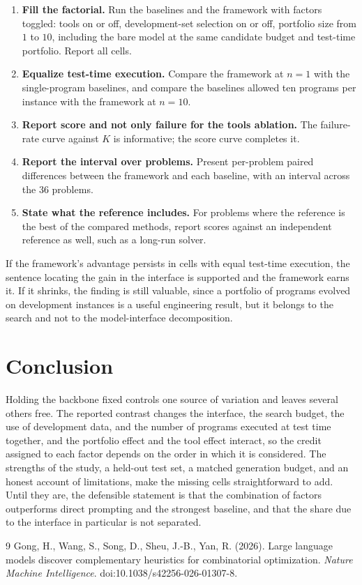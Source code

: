 \documentclass[11pt]{article}
\theoremstyle{definition}
\begin{document}
\begin{enumerate}
\item \textbf{Fill the factorial.} Run the baselines and the framework with factors toggled: tools on or off, development-set selection on or off, portfolio size from $1$ to $10$, including the bare model at the same candidate budget and test-time portfolio. Report all cells.
\item \textbf{Equalize test-time execution.} Compare the framework at $n=1$ with the single-program baselines, and compare the baselines allowed ten programs per instance with the framework at $n=10$.
\item \textbf{Report score and not only failure for the tools ablation.} The failure-rate curve against $K$ is informative; the score curve completes it.
\item \textbf{Report the interval over problems.} Present per-problem paired differences between the framework and each baseline, with an interval across the 36 problems.
\item \textbf{State what the reference includes.} For problems where the reference is the best of the compared methods, report scores against an independent reference as well, such as a long-run solver.
\end{enumerate}
If the framework's advantage persists in cells with equal test-time execution, the sentence locating the gain in the interface is supported and the framework earns it. If it shrinks, the finding is still valuable, since a portfolio of programs evolved on development instances is a useful engineering result, but it belongs to the search and not to the model-interface decomposition.

\section{Conclusion}

Holding the backbone fixed controls one source of variation and leaves several others free. The reported contrast changes the interface, the search budget, the use of development data, and the number of programs executed at test time together, and the portfolio effect and the tool effect interact, so the credit assigned to each factor depends on the order in which it is considered. The strengths of the study, a held-out test set, a matched generation budget, and an honest account of limitations, make the missing cells straightforward to add. Until they are, the defensible statement is that the combination of factors outperforms direct prompting and the strongest baseline, and that the share due to the interface in particular is not separated.

\begin{thebibliography}{9}
 Gong, H., Wang, S., Song, D., Sheu, J.-B., Yan, R. (2026). Large language models discover complementary heuristics for combinatorial optimization. \emph{Nature Machine Intelligence}. doi:10.1038/s42256-026-01307-8.
\end{thebibliography}
\end{document}
